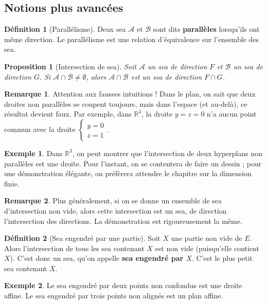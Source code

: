 \documentclass[french]{book}
\newcommand{\R}{\mathbb{R}}
\theoremstyle{plain}
\newtheorem{prop}{Proposition}[chapter]
\theoremstyle{definition}
\newtheorem{dfn}{Définition}[chapter]
\newtheorem{exa}{Exemple}[chapter]
\newtheorem{rmq}{Remarque}[chapter]
\theoremstyle{remark}
\begin{document}
\subsection{Notions plus avancées}
\begin{dfn}[Parallélisme]
	Deux sea $\mathcal{A}$ et $\mathcal{B}$ sont dits \textbf{parallèles} lorsqu'ils ont même direction. Le parallélisme est une relation d'équivalence sur l'ensemble des sea.
\end{dfn}
\begin{prop}[Intersection de sea]
	Soit $\mathcal{A}$ un sea de direction $F$ et $\mathcal{B}$ un sea de direction $G$. Si $\mathcal{A}\cap\mathcal{B}\ne\emptyset$, alors $\mathcal{A}\cap\mathcal{B}$ est un sea de direction $F\cap G$.
\end{prop}
\begin{rmq}
	Attention aux fausses intuitions ! Dans le plan, on sait que deux droites non parallèles se coupent toujours, mais dans l'espace (et au-delà), ce résultat devient faux. Par exemple, dans $\R^3$, la droite $y=z=0$ n'a aucun point commun avec la droite $\displaystyle\left \{\begin{array}{ll}y=0 \\ z=1 \end{array}\right.$.
\end{rmq}
\begin{exa}
	Dans $\R^3$, on peut montrer que l'intersection de deux hyperplans non parallèles est une droite. Pour l'instant, on se contentera de faire un dessin ; pour une démonstration élégante, on préfèrera attendre le chapitre sur la dimension finie.
\end{exa}
\begin{rmq}
	Plus généralement, si on se donne un ensemble de sea d'intersection non vide, alors cette intersection est un sea, de direction l'intersection des directions. La démonstration est rigoureusement la même.
\end{rmq}
\begin{dfn}[Sea engendré par une partie]
	Soit $X$ une partie non vide de $E$. Alors l'intersection de tous les sea contenant $X$ est non vide (puisqu'elle contient $X$). C'est donc un sea, qu'on appelle \textbf{sea engendré par $X$}. C'est le plus petit sea contenant $X$.
\end{dfn}
\begin{exa}
	Le sea engendré par deux points non confondus est une droite affine. Le sea engendré par trois points non alignés est un plan affine.
\end{exa}
\newpage
\end{document}
